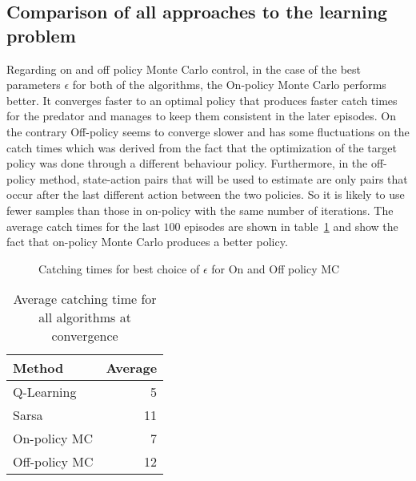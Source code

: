 \documentclass[paper=a4, fontsize=11pt]{scrartcl}
\numberwithin{equation}{section}		%
\numberwithin{figure}{section}			%
\numberwithin{table}{section}				%
\begin{document}
\subsection{Comparison of all approaches to the learning problem}
Regarding on and off policy Monte Carlo control, in the case of the best parameters $\epsilon$ for both of the algorithms, the On-policy Monte Carlo performs better. It converges faster to an optimal policy that produces faster catch times for the predator and manages to keep them consistent in the later episodes. On the contrary Off-policy seems to converge slower and has some fluctuations on the catch times which was derived from the fact that the optimization of the target policy was done through a different behaviour policy. Furthermore, in the off-policy method, state-action pairs that will be used to estimate are only pairs that occur after the last different action between the two policies. So it is likely to use fewer samples than those in on-policy with the same number of iterations. The average catch times for the last $100$ episodes are shown in table~\ref{compavg} and show the fact that on-policy Monte Carlo produces a better policy.
\begin{figure}[H] \centering
\caption{Catching times for best choice of $\epsilon$ for On and Off policy MC}\label{figure:onoffcomp} 
\end{figure}

\begin{table}[H]
\caption{Average catching time for all algorithms at convergence}
\centering
\begin{tabular}{|l|r|}
\hline
Method & Average \\\hline
Q-Learning& 5 \\\hline
Sarsa& 11 \\\hline
On-policy MC& 7\\\hline
Off-policy MC& 12\\\hline
\end{tabular}
\label{compavg}
\end{table}
\end{document}
